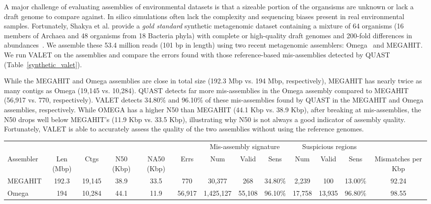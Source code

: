 A major challenge of evaluating assemblies of environmental datasets is that a sizeable portion of the organsisms are unknown or lack a draft genome to compare against.
In silico simulations often lack the complexity and sequencing biases present in real environmental samples.
Fortunately, Shakya et al. provide a \emph{gold standard} synthetic metagenomic dataset containing a mixture of 64 organisms (16 members of Archaea and 48 organisms from 18 Bacteria phyla) with complete or high-quality draft genomes and 200-fold differences in abundances~\cite{shakya2013comparative}.
We assemble these 53.4 million reads (101 bp in length) using two recent metagenomic assemblers: Omega~\cite{haider2014omega} and MEGAHIT\cite{li2015megahit}.
We run VALET on the assemblies and compare the errors found with those reference-based mis-assemblies detected by QUAST (Table~\ref{synthetic_valet}).

While the MEGAHIT and Omega assemblies are close in total size (192.3 Mbp vs. 194 Mbp, respectively), MEGAHIT has nearly twice as many contigs as Omega (19,145 vs. 10,284).
QUAST detects far more mis-assemblies in the Omega assembly compared to MEGAHIT (56,917 vs. 770, respectively).
VALET detects 34.80\% and 96.10\% of these mis-assemblies found by QUAST in the MEGAHIT and Omega assemblies, respectively.
While OMEGA has a higher N50 than MEGAHIT (44.1 Kbp vs. 38.9 Kbp), after breaking at mis-assemblies, the N50 drops well below MEGAHIT's (11.9 Kbp vs. 33.5 Kbp), illustrating why N50 is not always a good indicator of assembly quality.
Fortunately, VALET is able to accurately assess the quality of the two assemblies without using the reference genomes.

\begin{landscape}
\renewcommand{\baselinestretch}{1}
\small\normalsize
\begin{table*}[tb!]
\centering
\caption{My caption}
\footnotesize
\label{synthetic_valet}
\begin{tabular}{|l|c|c|c|c|c|c|c|c|c|c|c|c|}
  \hline
  \multicolumn{6}{|c}{} & \multicolumn{3}{|c|}{Mis-assembly signature} & \multicolumn{3}{c|}{Suspicious regions}   &  \\
  Assembler & Len (Mbp) & Ctgs   & N50 (Kbp) & NA50 (Kbp) & Errs   & Num       & Valid  & Sens    & Num    & Valid  & Sens    & Mismatches per Kbp \\
  \hline
  MEGAHIT   & 192.3     & 19,145 & 38.9      & 33.5       & 770    & 30,377    & 268    & 34.80\% & 2,239  & 100    & 13.00\% & 92.24              \\
  Omega     & 194       & 10,284 & 44.1      & 11.9       & 56,917 & 1,425,127 & 55,108 & 96.10\% & 17,758 & 13,935 & 96.80\% & 98.55 \\
  \hline
\end{tabular}
\end{table*}
\renewcommand{\baselinestretch}{2}
\small\normalsize
\end{landscape}


